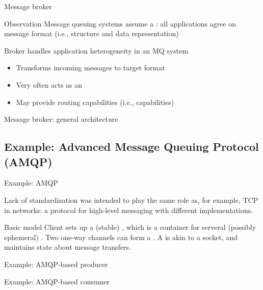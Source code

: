 \begin{slide}{Message broker}
  \begin{block}{Observation} 
    Message queuing systems assume a : all applications agree on message
    format (i.e., structure and data representation)
  \end{block}
  \begin{block}{Broker handles application heterogeneity in an MQ system}
    \begin{itemize}\tightlist
    \item Transforms incoming messages to target format
    \item Very often acts as an 
    \item May provide  routing capabilities (i.e.,  capabilities)
    \end{itemize}
  \end{block}
\end{slide}
\begin{slide}{Message broker: general architecture}
  \begin{centerfig}
  \end{centerfig}
\end{slide}
\subsection{Example: Advanced Message Queuing Protocol (AMQP)}
\begin{slide}{Example: AMQP}
  \begin{block}{Lack of standardization}
     was intended to play the same role as, for example, TCP in
    networks: a protocol for high-level messaging with different implementations.
  \end{block}
  \begin{centerfig}
  \end{centerfig}
  \begin{block}{Basic model}
    Client sets up a (stable) , which is a container for serveral (possibly ephemeral)
    . Two one-way channels can form a . A  is akin to a
    socket, and maintains state about message transfers.
  \end{block}
\end{slide}
\begin{slide}{Example: AMQP-based producer}
  \begin{centerfig}
  \end{centerfig}
\end{slide}
\begin{slide}{Example: AMQP-based consumer}
  \begin{centerfig}
  \end{centerfig}
\end{slide}
